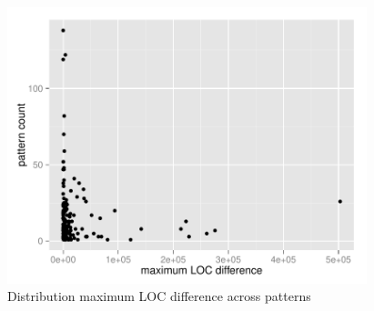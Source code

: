 \begin{figure}[H]
\caption{Distribution maximum LOC difference
across patterns}\label{figure:pattern_loc_diff}
\centering
	\includegraphics[width=296pt]{images/pattern_LOC_diff_100.pdf}
\end{figure}